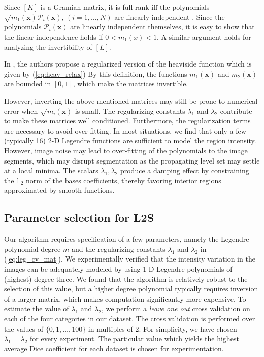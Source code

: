 Since $\left[K\right]$ is a Gramian matrix, it is full rank iff the polynomials $\sqrt{m_1(\textbf{x})}\mathcal{P}_i(\textbf{x})$, $(i=1,\ldots,N)$ are linearly independent \cite{gramian}. Since the polynomials $\mathcal{P}_i(\textbf{x})$ are linearly independent themselves, it is easy to show that the linear independence holds if $0< m_1(x)< 1$. A similar argument holds for analyzing the invertibility of $\left[L\right]$. 

In \cite{chan_vese}, the authors propose a regularized version of the heaviside function which is given by (\ref{eq:heav_relax})
By this definition, the functions $m_1(\textbf{x})$ and $m_2(\textbf{x})$ are bounded in $\left[0,1\right]$, which make the matrices invertible. 

However, inverting the above mentioned matrices may still be prone to numerical error  when $\sqrt{m_i(\textbf{x})}$ is small. The regularizing constants $\lambda_1$ and $\lambda_2$ contribute to make these matrices well conditioned. Furthermore, the regularization terms are necessary to avoid over-fitting. In most situations, we find that only a few (typically 16) 2-D Legendre functions are sufficient to model the region intensity. However, image noise may lead to over-fitting of the polynomials to the image segments, which may disrupt segmentation as the propagating level set may settle at a local minima. The scalars $\lambda_1,\lambda_2$ produce a damping effect by constraining the $\mathbb{L}_2$ norm of the bases coefficients, thereby favoring interior regions approximated by smooth functions. 

\subsection{Parameter selection for L2S}
Our algorithm requires specification of a few parameters, namely the Legendre polynomial degree $m$ and the regularizing constants $\lambda_1$ and $\lambda_2$ in (\ref{eq:leg_cv_mat}). We experimentally verified that the intensity variation in the images can be adequately modeled by using 1-D Legendre polynomials of (highest) degree three. We found that the algorithm is relatively robust to the selection of this value, but a higher degree polynomial typically requires inversion of a larger matrix, which makes computation significantly more expensive. To estimate the value of $\lambda_1$ and $\lambda_2$, we perform a \textit{leave one out} cross validation on each of the four categories in our dataset. The cross validation is performed over the values of $\{0,1,\ldots,100\}$ in multiples of 2. For simplicity, we have chosen $\lambda_1=\lambda_2$ for every experiment. The particular value which yields the highest average Dice coefficient for each dataset is chosen for experimentation. 


